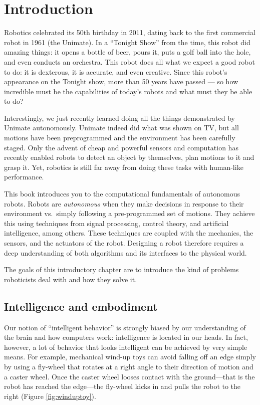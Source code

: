 \chapter{Introduction}\label{chap:introduction}
Robotics celebrated its 50th birthday in 2011, dating back to the first commercial robot in 1961 (the Unimate). In a ``Tonight Show'' from the time, this robot did amazing things: it opens a bottle of beer, pours it, puts a golf ball into the hole, and even conducts an orchestra. This robot does all what we expect a good robot to do: it is dexterous, it is accurate, and even creative. Since this robot's appearance on the Tonight show, more than 50 years have passed --- so how incredible must be the capabilities of today's robots and what must they be able to do?

Interestingly, we just recently learned doing all the things demonstrated by Unimate autonomously. Unimate indeed did what was shown on TV, but all motions have been preprogrammed and the environment has been carefully staged.  Only the advent of cheap and powerful sensors and computation has recently enabled robots to detect an object by themselves, plan motions to it and grasp it. Yet, robotics is still far away from doing these tasks with human-like performance.

This book introduces you to the computational fundamentals of autonomous robots. Robots are \emph{autonomous} when they make decisions in response to their environment vs.\ simply following a pre-programmed set of motions. They achieve this using techniques from signal processing, control theory, and artificial intelligence, among others. These techniques are coupled with the mechanics, the sensors, and the actuators of the robot. Designing a robot therefore requires a deep understanding of both algorithms and its interfaces to the physical world.

The goals of this introductory chapter are to introduce the kind of problems roboticists deal with and how they solve it.

\section{Intelligence and embodiment}
Our notion of ``intelligent behavior'' is strongly biased by our understanding of the brain and how computers work: intelligence is located in our heads. In fact, however, a lot of behavior that looks intelligent can be achieved by very simple means. For example, mechanical wind-up toys can avoid falling off an edge simply by using a fly-wheel that rotates at a right angle to their direction of motion and a caster wheel. Once the caster wheel looses contact with the ground---that is the robot has reached the edge---the fly-wheel kicks in and pulls the robot to the right (Figure \ref{fig:winduptoy}). 

